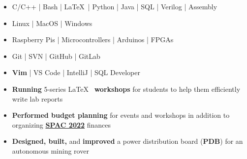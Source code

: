 \vspace{0.15cm}
\begin{itemize}
    \item {C/C++} | {Bash} | {\LaTeX}\ | {Python} | {Java} | {SQL} | {Verilog} | {Assembly}
    \item {Linux} | {MacOS} | {Windows} 
\end{itemize}

\vspace{0.15cm}
\vspace{0.15cm}

\begin{itemize}
    \item {Raspberry Pis} | {Microcontrollers} | {Arduinos} | {FPGAs}
\end{itemize}

\vspace{0.15cm}
\vspace{0.15cm}
\begin{itemize}
    \item {Git} | {SVN} | {GitHub} | {GitLab}\\
    \item {\bfseries Vim} | {VS Code} | {IntelliJ} | {SQL Developer}
\end{itemize}
\smallskip\smallskipk

\begin{itemize}
    \item {\bfseries Running} 5-series \LaTeX~ {\bfseries workshops} for students to help them efficiently write lab reports
\end{itemize}
\begin{itemize}
    \item {\bfseries Performed budget planning} for events and workshops in addition to organizing {\bfseries \href{https://ieeespac.ca/}{SPAC 2022}} finances
\end{itemize}
\smallskip\smallskip
{}
\begin{itemize}
    \item {\bfseries Designed, built,} and {\bfseries improved} a power distribution board ({\bfseries PDB}) for an autonomous mining rover
\end{itemize}

